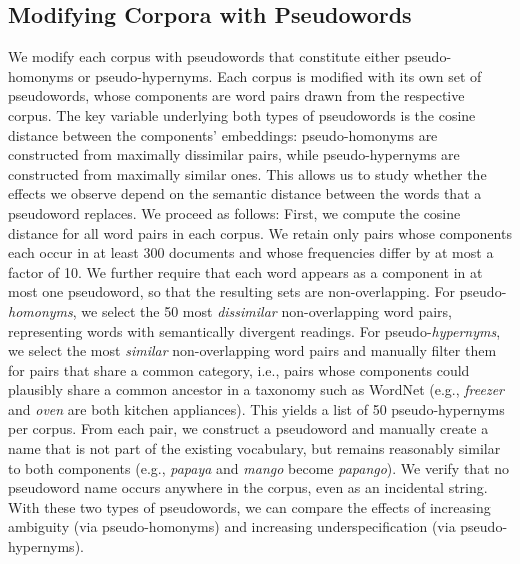 \documentclass[final]{clv2025}
\begin{document}
\subsection{Modifying Corpora with Pseudowords}\label{sec:pseudo}
We modify each corpus with pseudowords that constitute either pseudo-homonyms or pseudo-hypernyms. Each corpus is modified with its own set of pseudowords, whose components are word pairs drawn from the respective corpus. The key variable underlying both types of pseudowords is the cosine distance between the components' embeddings: pseudo-homonyms are constructed from maximally dissimilar pairs, while pseudo-hypernyms are constructed from maximally similar ones. This allows us to study whether the effects we observe depend on the semantic distance between the words that a pseudoword replaces.
We proceed as follows: First, we compute the cosine distance for all word pairs in each corpus. We retain only pairs whose components each occur in at least 300 documents and whose frequencies differ by at most a factor of 10. We further require that each word appears as a component in at most one pseudoword, so that the resulting sets are non-overlapping.
For pseudo-\emph{homonyms}, we select the 50 most \emph{dissimilar} non-overlapping word pairs, representing words with semantically divergent readings.
For pseudo-\emph{hypernyms}, we select the most \emph{similar} non-overlapping word pairs and manually filter them for pairs that share a common category, i.e., pairs whose components could plausibly share a common ancestor in a taxonomy such as WordNet (e.g., \emph{freezer} and \emph{oven} are both kitchen appliances). This yields a list of 50 pseudo-hypernyms per corpus.
From each pair, we construct a pseudoword and manually create a name that is not part of the existing vocabulary, but remains reasonably similar to both components (e.g., \emph{papaya} and \emph{mango} become \emph{papango}). We verify that no pseudoword name occurs anywhere in the corpus, even as an incidental string. With these two types of pseudowords, we can compare the effects of increasing ambiguity (via pseudo-homonyms) and increasing underspecification (via pseudo-hypernyms).
\end{document}
